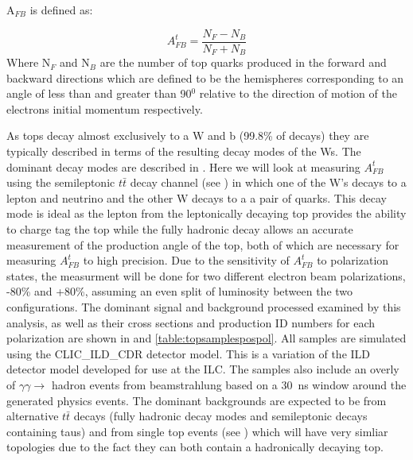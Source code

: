 A$_{FB}$ is defined as:

\begin{equation}
A_{FB}^t=\frac{N_F-N_B}{N_F+N_B}
\end{equation}
Where N$_{F}$ and N$_{B}$ are the number of top quarks produced in the forward and backward directions which are defined to be the hemispheres corresponding to an angle of less than and greater than 90$^0$ relative to the direction of motion of the electrons initial momentum respectively.

As tops decay almost exclusively to a W and b (99.8\% of decays) they are typically described in terms of the resulting decay modes of the Ws. The dominant decay modes are described in . Here we will look at measuring $A_{FB}^{t}$ using the semileptonic $t\bar{t}$ decay channel (see ) in which one of the W's decays to a lepton and neutrino and the other W decays to a a pair of quarks. This decay mode is ideal as the lepton from the leptonically decaying top provides the ability to charge tag the top while the fully hadronic decay allows an accurate measurement of the production angle of the top, both of which are necessary for measuring $A_{FB}^{t}$ to high precision. Due to the sensitivity of $A_{FB}^{t}$ to polarization states, the measurment will be done for two different electron beam polarizations, -80\% and +80\%, assuming an even split of luminosity between the two configurations. The dominant signal and background processed examined by this analysis, as well as their cross sections and production ID numbers for each polarization are shown in  and \ref{table:topsamplespospol}. All samples are simulated using the CLIC\_ILD\_CDR detector model. This is a variation of the ILD detector model developed for use at the ILC. The samples also include an overly of $\gamma\gamma\rightarrow$ hadron events from beamstrahlung based on a 30~ns window around the generated physics events. The dominant backgrounds are expected to be from alternative $t\bar{t}$ decays (fully hadronic decay modes and semileptonic decays containing taus) and from single top events (see ) which will have very simliar topologies due to the fact they can both contain a hadronically decaying top.

